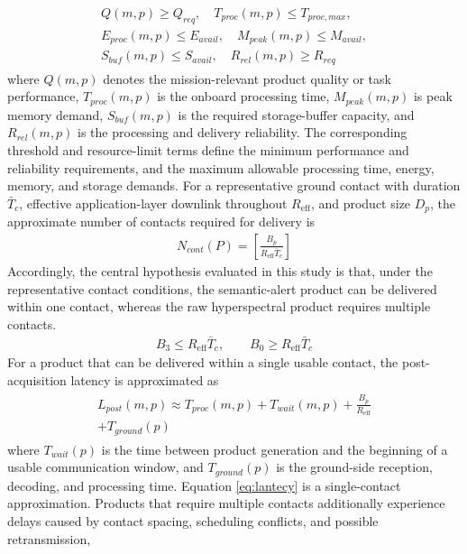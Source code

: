 \documentclass[a4paper,fleqn]{cas-dc}
\begin{document}
\begin{eqnarray}
	\begin{aligned}
		Q(m,p) \geq Q_{req}, \quad
		T_{proc}(m,p) \leq T_{proc, max},\\
		E_{proc}(m,p) \leq E_{avail},\quad
		M_{peak}(m,p) \leq M_{avail},\\
		S_{buf}(m,p) \leq S_{avail},\quad
		R_{rel}(m,p) \geq R_{req}
	\end{aligned}
\end{eqnarray}
where \(Q(m,p)\) denotes the mission-relevant product quality or task performance, \(T_{proc}(m,p)\) is the onboard processing time, \(M_{peak}(m,p)\) is peak memory demand, \(S_{buf}(m,p)\) is the required storage-buffer capacity, and \(R_{rel}(m,p)\) is the processing and delivery reliability. The corresponding threshold and resource-limit terms define the minimum performance and reliability requirements, and the maximum allowable processing time, energy, memory, and storage demands.
For a representative ground contact with duration \(\bar{T}_c\), effective application-layer downlink throughout \(R_{\mathrm{eff}}\), and product size \(D_p\), the approximate number of contacts required for delivery is
\begin{eqnarray}
	N_{cont}(P) = \left[\frac{B_p}{R_{\mathrm{eff}}\bar{T}_c}\right]
\end{eqnarray}
Accordingly, the central hypothesis evaluated in this study is that, under the representative contact conditions, the semantic-alert product can be delivered within one contact, whereas the raw hyperspectral product requires multiple contacts.
\begin{eqnarray}
	B_3 \leq R_{\mathrm{eff}}\bar{T}_c, \qquad B_0 \ge R_{\mathrm{eff}}\bar{T}_c
\end{eqnarray}
For a product that can be delivered within a single usable contact, the post-acquisition latency is approximated as
\begin{eqnarray}\label{eq:lantecy}
	\begin{aligned}
		L_{post}(m,p) \approx T_{proc}(m,p) + T_{wait}(m,p) + \frac{B_p}{R_{\mathrm{eff}}}\\
		 + T_{ground}(p)
	\end{aligned}
\end{eqnarray}
where \(T_{wait}(p)\) is the time between product generation and the beginning of a usable communication window, and \(T_{ground}(p)\) is the ground-side reception, decoding, and processing time. Equation \ref{eq:lantecy} is a single-contact approximation. Products that require multiple contacts additionally experience delays caused by contact spacing, scheduling conflicts, and possible retransmission,
\end{document}
